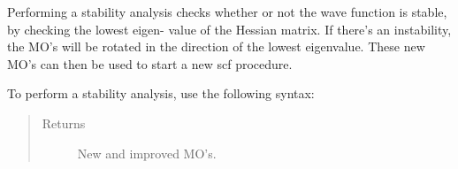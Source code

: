 \documentclass[letterpaper,10pt,english]{sphinxmanual}
\begin{document}
\begin{fulllineitems}

\begin{fulllineitems}
\label{\detokenize{UHF:ghf.UHF.UHF.stability}}
Performing a stability analysis checks whether or not the wave function is stable, by checking the lowest eigen-
value of the Hessian matrix. If there’s an instability, the MO’s will be rotated in the direction
of the lowest eigenvalue. These new MO’s can then be used to start a new scf procedure.

To perform a stability analysis, use the following syntax:

\begin{sphinxVerbatim}[commandchars=\\\{\}]
           
   
  
\end{sphinxVerbatim}
\begin{quote}\begin{description}
\item[{Returns}] \leavevmode
New and improved MO’s.

\end{description}\end{quote}

\end{fulllineitems}


\end{fulllineitems}
\end{document}
